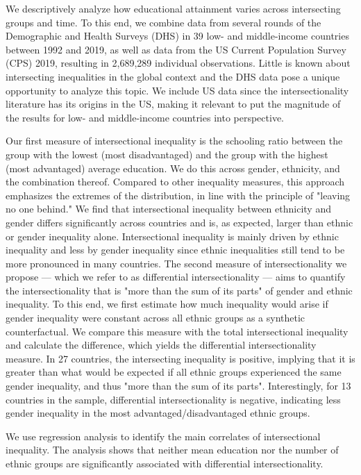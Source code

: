 We descriptively analyze how educational attainment varies across intersecting groups and time. To this end, we combine data from several rounds of the Demographic and Health Surveys (DHS) in 39 low- and middle-income countries between 1992 and 2019, as well as data from the US Current Population Survey (CPS) 2019, resulting in 2,689,289 individual observations. Little is known about intersecting inequalities in the global context and the DHS data pose a unique opportunity to analyze this topic. We include US data since the intersectionality literature has its origins in the US, making it relevant to put the magnitude of the results for low- and middle-income countries into perspective. 

Our first measure of intersectional inequality is the schooling ratio between the group with the lowest (most disadvantaged) and the group with the highest (most advantaged) average education. We do this across gender, ethnicity, and the combination thereof. Compared to other inequality measures, this approach emphasizes the extremes of the distribution, in line with the principle of "leaving no one behind." We find that intersectional inequality between ethnicity and gender differs significantly across countries and is, as expected, larger than ethnic or gender inequality alone. Intersectional inequality is mainly driven by ethnic inequality and less by gender inequality since ethnic inequalities still tend to be more pronounced in many countries. The second measure of intersectionality we propose --- which we refer to as differential intersectionality --- aims to quantify the intersectionality that is "more than the sum of its parts" of gender and ethnic inequality. To this end, we first estimate how much inequality would arise if gender inequality were constant across all ethnic groups as a synthetic counterfactual. We compare this measure with the total intersectional inequality and calculate the difference, which yields the differential intersectionality measure. In 27 countries, the intersecting inequality is positive, implying that it is greater than what would be expected if all ethnic groups experienced the same gender inequality, and thus "more than the sum of its parts". Interestingly, for 13 countries in the sample, differential intersectionality is negative, indicating less gender inequality in the most advantaged/disadvantaged ethnic groups. 

We use regression analysis to identify the main correlates of intersectional inequality. The analysis shows that neither mean education nor the number of ethnic groups are significantly associated with differential intersectionality. 

